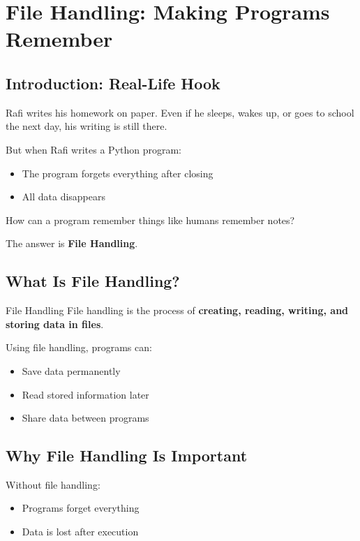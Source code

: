 \chapter{File Handling: Making Programs Remember}

\section{Introduction: Real-Life Hook}

Rafi writes his homework on paper.
Even if he sleeps, wakes up, or goes to school the next day,  
his writing is still there.

But when Rafi writes a Python program:
\begin{itemize}
    \item The program forgets everything after closing
    \item All data disappears
\end{itemize}

How can a program remember things like humans remember notes?

The answer is \textbf{File Handling}.

\section{What Is File Handling?}

\begin{definition}{File Handling}
File handling is the process of \textbf{creating, reading, writing, and storing data in files}.
\end{definition}

Using file handling, programs can:
\begin{itemize}
    \item Save data permanently
    \item Read stored information later
    \item Share data between programs
\end{itemize}

\section{Why File Handling Is Important}

Without file handling:
\begin{itemize}
    \item Programs forget everything
    \item Data is lost after execution
\end{itemize}

